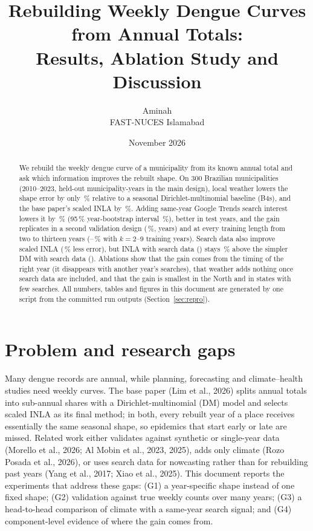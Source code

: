 \documentclass[11pt,a4paper]{article}
\title{Rebuilding Weekly Dengue Curves from Annual Totals:\\Results, Ablation Study and Discussion}
\author{Aminah\\FAST-NUCES Islamabad}
\date{November 2026}
\begin{document}
\maketitle

\begin{abstract}
We rebuild the weekly dengue curve of a municipality from its known annual total and ask which information improves the
rebuilt shape. On 300 Brazilian municipalities (2010--2023, \nRows{} held-out municipality-years in the main design),
local weather lowers the shape error by only \weatherGainA\,\% relative to a seasonal Dirichlet-multinomial baseline
(B4s), and the base paper's scaled INLA by \inlaGainA\,\%. Adding same-year Google Trends search interest lowers it by
\trendsGainA\,\% (95\,\% year-bootstrap interval \trendsCIyearA\,\%), better in \trendsYearsA{} test years, and the gain
replicates in a second validation design (\trendsGainC\,\%, \trendsYearsC{} years) and at every training length
from two to thirteen years (\lcGainMin--\lcGainMax\,\% with $k=2$--9 training years). Search data also improve
scaled INLA (\inlaTrendsGain\,\% less error), but INLA with search data (\jsdInlaTrendsA) stays \inlaTrendsVsSTwo\,\%
above the simpler DM with search data (\jsdTrendsA). Ablations show that the gain comes
from the timing of the right year (it disappears with another year's searches), that weather adds nothing once search
data are included, and that the gain is smallest in the North and in states with few searches. All numbers, tables and
figures in this document are generated by one script from the committed run outputs (Section~\ref{sec:repro}).
\end{abstract}

\section{Problem and research gaps}
Many dengue records are annual, while planning, forecasting and climate--health studies need weekly curves. The base
paper (Lim et al., 2026) splits annual totals into sub-annual shares with a Dirichlet-multinomial (DM) model and selects
scaled INLA as its final method; in both, every rebuilt year of a place receives essentially the same seasonal shape,
so epidemics that start early or late are missed. Related work either validates against synthetic or single-year data
(Morello et al., 2026; Al Mobin et al., 2023, 2025), adds only climate (Rozo Posada et al., 2026), or uses search data
for nowcasting rather than for rebuilding past years (Yang et al., 2017; Xiao et al., 2025). This document reports the
experiments that address these gaps:
(G1) a year-specific shape instead of one fixed shape;
(G2) validation against true weekly counts over many years;
(G3) a head-to-head comparison of climate with a same-year search signal; and
(G4) component-level evidence of where the gain comes from.
\end{document}
